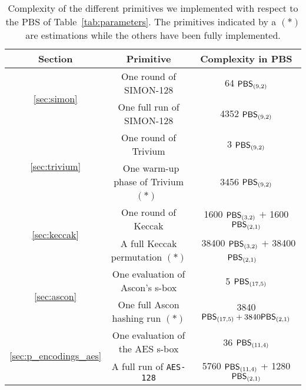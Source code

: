 \begin{table}
    \centering
    \begin{tabular}{|c|c|c|}
        \hline
        \textbf{Section} & \textbf{Primitive} & \textbf{Complexity in PBS}  \\
        \hline
        \multirow{2}{*}{\ref{sec:simon}} & One round of SIMON-128 & 64 \texttt{$\mathsf{PBS}_{(9, 2)}$}\\
        \cline{2-3}
        & One full run of SIMON-128 & 4352 \texttt{$\mathsf{PBS}_{(9, 2)}$}\\
        \hline
        \multirow{2}{*}{\ref{sec:trivium}} & One round of Trivium & 3 \texttt{$\mathsf{PBS}_{(9, 2)}$}\\
        \cline{2-3}
        & ~One warm-up phase of Trivium $(*)$~ & 3456 \texttt{$\mathsf{PBS}_{(9, 2)}$}\\
        \hline
        \multirow{2}{*}{\ref{sec:keccak}} & One round of Keccak & 1600 \texttt{$\mathsf{PBS}_{(3, 2)}$} $+$ 1600 \texttt{$\mathsf{PBS}_{(2, 1)}$}\\
        \cline{2-3}
        & A full Keccak permutation $(*)$ & ~38400 \texttt{$\mathsf{PBS}_{(3, 2)}$} $+$ 38400 \texttt{$\mathsf{PBS}_{(2, 1)}$} ~\\
        \hline
      \multirow{2}{*}{ \ref{sec:ascon}} & One evaluation of Ascon's s-box & 5 \texttt{$\mathsf{PBS}_{(17, 5)}$}\\
      \cline{2-3}
      & One full Ascon hashing run $(*)$ & 3840 \texttt{$\mathsf{PBS}_{(17, 5)} + 3840 \mathsf{PBS}_{(2, 1)}$}\\
        \hline
        \multirow{2}{*}{\ref{sec:p_encodings_aes}} & One evaluation of the AES s-box & 36 \texttt{$\mathsf{PBS}_{(11, 4)}$}\\
        \cline{2-3}
        & A full run of \texttt{AES-128}  & 5760 \texttt{$\mathsf{PBS}_{(11, 4)}$} + 1280 \texttt{$\mathsf{PBS}_{(2, 1)}$}\\
        \hline
    \end{tabular}
    \medskip
    \caption{Complexity of the different primitives we implemented with respect to the PBS of Table~\ref{tab:parameters}. The primitives indicated by a $(*)$ are estimations while the others have been fully implemented.}
    \label{tab:complexity_primitives}
\end{table}




